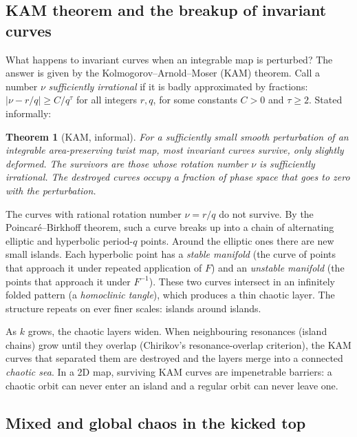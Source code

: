 \documentclass[11pt,a4paper]{article}
\newtheorem*{theorem*}{Theorem}
\begin{document}
\subsection{KAM theorem and the breakup of invariant curves}

What happens to invariant curves when an integrable map is perturbed? The answer is given by the
Kolmogorov--Arnold--Moser (KAM) theorem. Call a number $\nu$ \emph{sufficiently irrational} if it is badly
approximated by fractions: $|\nu - r/q| \ge C/q^{\tau}$ for all integers $r, q$, for some constants $C > 0$ and $\tau
\ge 2$. Stated informally:
\begin{theorem*}[KAM, informal]
For a sufficiently small smooth perturbation of an integrable area-preserving twist map, most invariant curves
survive, only slightly deformed. The survivors are those whose rotation number $\nu$ is sufficiently irrational. The
destroyed curves occupy a fraction of phase space that goes to zero with the perturbation.
\end{theorem*}
The curves with rational rotation number $\nu = r/q$ do not survive. By the Poincaré--Birkhoff theorem, such a curve
breaks up into a chain of alternating elliptic and hyperbolic period-$q$ points. Around the elliptic ones there are new
small islands. Each hyperbolic point has a \emph{stable manifold} (the curve of points that approach it under
repeated application of $F$) and an \emph{unstable manifold} (the points that approach it under $F^{-1}$). These two
curves intersect in an infinitely folded pattern (a \emph{homoclinic tangle}), which produces a thin chaotic layer.
The structure repeats on ever finer scales: islands around islands.

As $k$ grows, the chaotic layers widen. When neighbouring resonances (island chains) grow until they overlap
(Chirikov's resonance-overlap criterion), the KAM curves that separated them are destroyed and the layers merge into a
connected \emph{chaotic sea}. In a 2D map, surviving KAM curves are impenetrable barriers: a chaotic orbit can never
enter an island and a regular orbit can never leave one.

\subsection{Mixed and global chaos in the kicked top}
\end{document}
